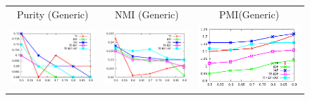 \documentclass[10pt,a5paper,twoside]{article}
\begin{document}
\begin{figure}[t!]
\begin{center}
{\begin{tabular}{ccc}
		{\Large Purity (Generic)} & {\Large NMI (Generic)} & 
		{\Large PMI(Generic)}\\
	
		\includegraphics[width=350pt]{Figs/2-1.pdf} & 
		\includegraphics[width=350pt]{Figs/2-2.pdf} & 
		 \includegraphics[width=350pt]{Figs/2-3.pdf} \\


\end{tabular}}
\end{center}
\end{figure}
\end{document}
